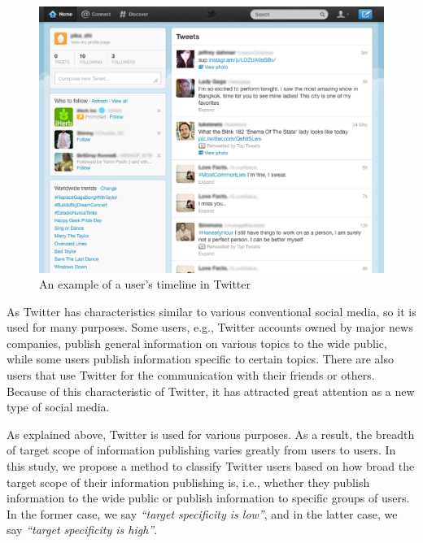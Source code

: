 \begin{figure}[t]
\begin{center}
\includegraphics[width=14cm]{images/screen_shot.eps}
 \caption{An example of a user's timeline in Twitter}
\label{fig:twitter}
\end{center}
\end{figure}

As Twitter has characteristics similar to various conventional social
media, so it is used for many purposes.  Some users, e.g., Twitter
accounts owned by major news companies, publish general information on
various topics to the wide public, while some users publish
information specific to certain topics.  There are also users that use
Twitter for the communication with their friends or others.  Because
of this characteristic of Twitter, it has attracted great attention as
a new type of social media.

As explained above, Twitter is used for various purposes.  As a result,
the breadth of target scope of information publishing varies greatly
from users to users.
In this study, we propose a method to classify
Twitter users based on how broad the target scope of
their information publishing is, i.e., whether they publish information
to the wide public or publish information to specific groups of users.
In the former case, we say \emph{``target specificity is
low''}, and in the latter case, we say \emph{``target specificity
is high''}.

